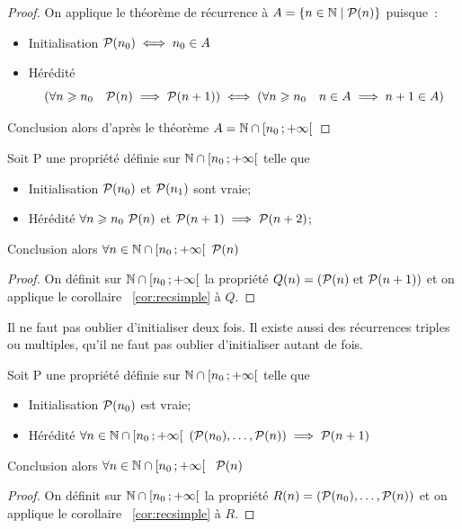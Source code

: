 \begin{proof}
  On applique le théorème de récurrence à \(A=\enstq{n\in\N}{\P(n)}\) puisque~:
  \begin{itemize}
  \item Initialisation \(\P(n_0) \iff n_0 \in A\)
  \item Hérédité
    \begin{equation}
      \left(\forall n\geqslant n_0 \quad \P(n) \implies \P(n+1)\right) \iff \left( \forall n \geqslant n_0 \quad n\in A \implies n+1\in A\right)
    \end{equation}
  \end{itemize}
  Conclusion alors d'après le théorème \(A=\N\cap \intervallefo{n_0}{+\infty}\)
\end{proof}
\begin{cor}
  \label{cor:recdouble}
  Soit P une propriété définie sur \(\N\cap \intervallefo{n_0}{+\infty}\) telle que
 \begin{itemize}
  \item Initialisation \(\P(n_0)\) et \(\P(n_1)\) sont vraie;
  \item Hérédité \(\forall n\geqslant n_0 \ \P(n)\) et \(\P(n+1) \implies \P(n+2)\);
  \end{itemize}
  Conclusion alors \(\forall n \in \N\cap \intervallefo{n_0}{+\infty} \ \P(n)\) 
\end{cor}
\begin{proof}
  On définit sur \(\N\cap \intervallefo{n_0}{+\infty}\) la propriété \(Q(n)=(\P(n) \text{ et } \P(n+1))\) et on applique le corollaire~
\ref{cor:recsimple} à \(Q\).
\end{proof}
Il ne faut pas oublier d'initialiser deux fois. Il existe aussi des récurrences triples ou multiples, qu'il ne faut pas oublier d'initialiser autant de fois.
\begin{cor}
  \label{cor:recforte}
  Soit P une propriété définie sur \(\N\cap \intervallefo{n_0}{+\infty}\) telle que
  \begin{itemize}
  \item Initialisation \(\P(n_0)\) est vraie;
  \item Hérédité \(\forall n \in \N\cap \intervallefo{n_0}{+\infty} \ (\P(n_0), \ldots, \P(n)) \implies \P(n+1)\)
  \end{itemize}
  Conclusion alors \(\forall n \in \N\cap \intervallefo{n_0}{+\infty}\ \ \P(n)\)
\end{cor}
\begin{proof}
  On définit sur \(\N\cap \intervallefo{n_0}{+\infty}\) la propriété \(R(n)=(\P(n_0), \ldots, \P(n))\) et on applique le corollaire~
\ref{cor:recsimple} à \(R\).
\end{proof}


